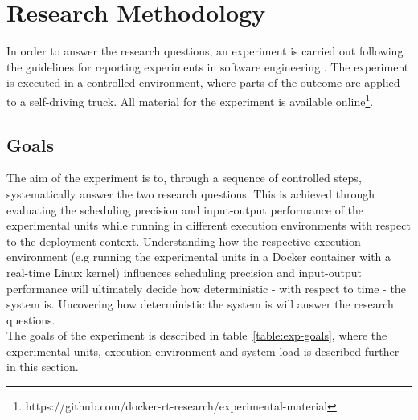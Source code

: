 \iffalse  \fi
\chapter{Research Methodology}\label{section:methodology}

In order to answer the research questions, an experiment is carried out following the guidelines for reporting experiments in software engineering \cite{Andreas}. The experiment is executed in a controlled environment, where parts of the outcome are applied to a self-driving truck. All material for the experiment is available online\footnote{https://github.com/docker-rt-research/experimental-material}. 


\section{Goals}
The aim of the experiment is to, through a sequence of controlled steps, systematically answer the two research questions. This is achieved through evaluating the scheduling precision and input-output performance of the experimental units while running in different execution environments with respect to the deployment context. Understanding how the respective execution environment (e.g running the experimental units in a Docker container with a real-time Linux kernel) influences scheduling precision and input-output performance will ultimately decide how deterministic - with respect to time - the system is. Uncovering how deterministic the system is will answer the research questions. \\

The goals of the experiment is described in table~\ref{table:exp-goals}, where the experimental units, execution environment and system load is described further in this section. 

